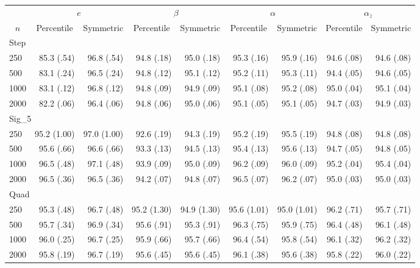 \documentclass{article}
\begin{document}
\begin{tabular}{lrrrrrrrr}
   \hline
 
       &  \multicolumn{2}{c}{$e$}    & \multicolumn{2}{c}{$\beta$}  & \multicolumn{2}{c}{$\alpha$}  & \multicolumn{2}{c}{$\alpha_z$} \\ 
         \multicolumn{1}{c}{$n$} & \multicolumn{1}{c}{Percentile}& \multicolumn{1}{c}{Symmetric}& \multicolumn{1}{c}{Percentile}& \multicolumn{1}{c}{Symmetric}& \multicolumn{1}{c}{Percentile}& \multicolumn{1}{c}{Symmetric}& \multicolumn{1}{c}{Percentile}& \multicolumn{1}{c}{Symmetric} \\ 
         \hline   
 \multicolumn{9}{l}{Step} \\ 
250 & 85.3 (.54) & 96.8 (.54) & 94.8 (.18) & 95.0 (.18) & 95.3 (.16) & 95.9 (.16) & 94.6 (.08) & 94.6 (.08) \\ 
  500 & 83.1 (.24) & 96.5 (.24) & 94.8 (.12) & 95.1 (.12) & 95.2 (.11) & 95.3 (.11) & 94.4 (.05) & 94.6 (.05) \\ 
  1000 & 83.1 (.12) & 96.8 (.12) & 94.8 (.09) & 94.9 (.09) & 95.1 (.08) & 95.2 (.08) & 95.0 (.04) & 95.1 (.04) \\ 
  2000 & 82.2 (.06) & 96.4 (.06) & 94.8 (.06) & 95.0 (.06) & 95.1 (.05) & 95.1 (.05) & 94.7 (.03) & 94.9 (.03) \\ 
       \hline   
 \multicolumn{9}{l}{Sig\_5} \\ 
250 & 95.2 (1.00) & 97.0 (1.00) & 92.6 (.19) & 94.3 (.19) & 95.2 (.19) & 95.5 (.19) & 94.8 (.08) & 94.8 (.08) \\ 
  500 & 95.6 (.66) & 96.6 (.66) & 93.3 (.13) & 94.5 (.13) & 95.4 (.13) & 95.6 (.13) & 94.7 (.05) & 94.8 (.05) \\ 
  1000 & 96.5 (.48) & 97.1 (.48) & 93.9 (.09) & 95.0 (.09) & 96.2 (.09) & 96.0 (.09) & 95.2 (.04) & 95.4 (.04) \\ 
  2000 & 96.5 (.36) & 96.5 (.36) & 94.2 (.07) & 94.8 (.07) & 96.5 (.07) & 96.2 (.07) & 95.0 (.03) & 95.0 (.03) \\ 
       \hline   
 \multicolumn{9}{l}{Quad} \\ 
250 & 95.3 (.48) & 96.7 (.48) & 95.2 (1.30) & 94.9 (1.30) & 95.6 (1.01) & 95.0 (1.01) & 96.2 (.71) & 95.7 (.71) \\ 
  500 & 95.7 (.34) & 96.9 (.34) & 95.6 (.91) & 95.3 (.91) & 96.3 (.75) & 95.9 (.75) & 96.4 (.48) & 96.1 (.48) \\ 
  1000 & 96.0 (.25) & 96.7 (.25) & 95.9 (.66) & 95.7 (.66) & 96.4 (.54) & 95.8 (.54) & 96.1 (.32) & 96.2 (.32) \\ 
  2000 & 95.8 (.19) & 96.7 (.19) & 95.6 (.45) & 95.6 (.45) & 96.1 (.38) & 95.6 (.38) & 95.8 (.22) & 96.0 (.22) \\ 
   \hline
\end{tabular}
\end{document}
